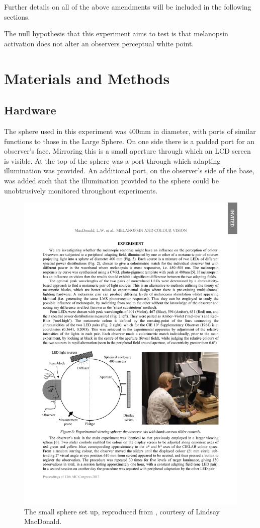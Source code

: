 Further details on all of the above amendments will be included in the following sections. 

The null hypothesis that this experiment aims to test is that melanopsin activation does not alter an observers perceptual white point.

\section{Materials and Methods}

\subsection{Hardware}

The sphere used in this experiment was 400mm in diameter, with ports of similar functions to those in the Large Sphere. On one side there is a padded port for an observer's face. Mirroring this is a small aperture through which an LCD screen is visible. At the top of the sphere was a port through which adapting illumination was provided. An additional port, on the observer's side of the base, was added such that the illumination provided to the sphere could be unobtrusively monitored throughout experiments.

\begin{figure}[htbp]
\includegraphics[max width=\textwidth,center]{figs/SmallSphere/diagram.pdf}
\caption{The small sphere set up, reproduced from \citet{macdonald_melanopsin_2017}, courtesy of Lindsay MacDonald.}
\label{fig:diagram}
\end{figure}

